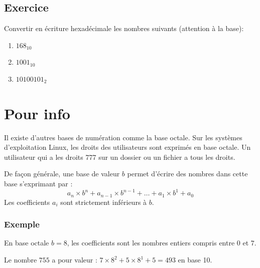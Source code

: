 \documentclass[11pt]{article}
\providecommand{\tightlist}{%
      \setlength{\itemsep}{0pt}\setlength{\parskip}{0pt}}
\begin{document}
\hypertarget{exercice-1}{%
\subsection{Exercice}\label{exercice-1}}

Convertir en écriture hexadécimale les nombres suivants (attention à la
base):

\begin{enumerate}
\def\labelenumi{\arabic{enumi}.}
\tightlist
\item
  \(168_{10}\)
\item
  \(1001_{10}\)
\item
  \(10100101_{2}\)
\end{enumerate}

    \hypertarget{pour-info}{%
\section{Pour info}\label{pour-info}}

Il existe d'autres bases de numération comme la base octale. Sur les
systèmes d'exploitation Linux, les droits des utilisateurs sont exprimés
en base octale. Un utilisateur qui a les droits 777 sur un dossier ou un
fichier a tous les droits.

De façon générale, une base de valeur \(b\) permet d'écrire des nombres
dans cette base s'exprimant par :
\[a_{n} \times b^{n} + a_{n-1} \times b^{n-1} + \ldots + a_{1} \times b^{1} + a_{0}\]
Les coefficients \(a_{i}\) sont strictement inférieurs à \(b\).

\hypertarget{exemple}{%
\subsubsection*{Exemple}\label{exemple}}

En base octale \(b=8\), les coefficients sont les nombres entiers
compris entre \(0\) et \(7\).

Le nombre \(755\) a pour valeur :
\(7 \times 8^{2}+5 \times 8^{1} + 5 = 493\) en base 10.

    
    
    
\end{document}
